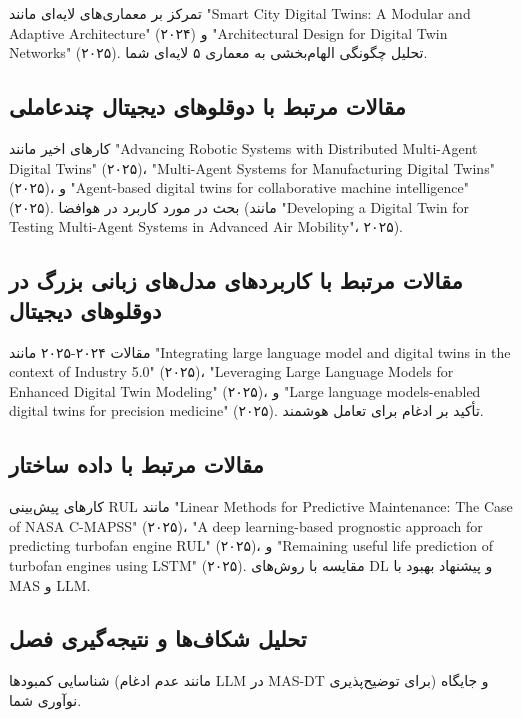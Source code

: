 تمرکز بر معماری‌های لایه‌ای مانند "Smart City Digital Twins: A Modular and Adaptive Architecture" (۲۰۲۴) و "Architectural Design for Digital Twin Networks" (۲۰۲۵). تحلیل چگونگی الهام‌بخشی به معماری ۵ لایه‌ای شما.

\subsection{مقالات مرتبط با دوقلوهای دیجیتال چندعاملی}
کارهای اخیر مانند "Advancing Robotic Systems with Distributed Multi-Agent Digital Twins" (۲۰۲۵)، "Multi-Agent Systems for Manufacturing Digital Twins" (۲۰۲۵)، و "Agent-based digital twins for collaborative machine intelligence" (۲۰۲۵). بحث در مورد کاربرد در هوافضا (مانند "Developing a Digital Twin for Testing Multi-Agent Systems in Advanced Air Mobility"، ۲۰۲۵).

\subsection{مقالات مرتبط با کاربردهای مدل‌های زبانی بزرگ در دوقلوهای دیجیتال}

مقالات ۲۰۲۴-۲۰۲۵ مانند "Integrating large language model and digital twins in the context of Industry 5.0" (۲۰۲۵)، "Leveraging Large Language Models for Enhanced Digital Twin Modeling" (۲۰۲۵)، و "Large language models-enabled digital twins for precision medicine" (۲۰۲۵). تأکید بر ادغام برای تعامل هوشمند.


\subsection{مقالات مرتبط با داده ساختار }
کارهای پیش‌بینی RUL مانند "Linear Methods for Predictive Maintenance: The Case of NASA C-MAPSS" (۲۰۲۵)، "A deep learning-based prognostic approach for predicting turbofan engine RUL" (۲۰۲۵)، و "Remaining useful life prediction of turbofan engines using LSTM" (۲۰۲۵). مقایسه با روش‌های DL و پیشنهاد بهبود با MAS و LLM.

\subsection{تحلیل شکاف‌ها و نتیجه‌گیری فصل}
شناسایی کمبودها (مانند عدم ادغام LLM در MAS-DT برای توضیح‌پذیری) و جایگاه نوآوری شما.






